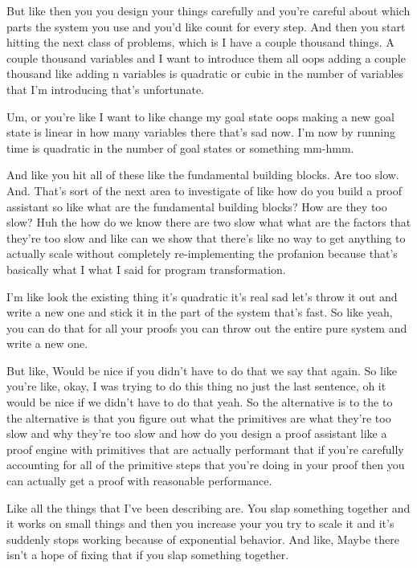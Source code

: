 But like then you you design your things carefully and you're careful about which parts the system you use and you'd like count for every step. And then you start hitting the next class of problems, which is I have a couple thousand things. A couple thousand variables and I want to introduce them all oops adding a couple thousand like adding n variables is quadratic or cubic in the number of variables that I'm introducing that's unfortunate. 

Um, or you're like I want to like change my goal state oops making a new goal state is linear in how many variables there that's sad now. I'm now by running time is quadratic in the number of goal states or something mm-hmm. 

And like you hit all of these like the fundamental building blocks. Are too slow. And. That's sort of the next area to investigate of like how do you build a proof assistant so like what are the fundamental building blocks? How are they too slow? Huh the how do we know there are two slow what what are the factors that they're too slow and like can we show that there's like no way to get anything to actually scale without completely re-implementing the profanion because that's basically what I what I said for program transformation. 

I'm like look the existing thing it's quadratic it's real sad let's throw it out and write a new one and stick it in the part of the system that's fast. So like yeah, you can do that for all your proofs you can throw out the entire pure system and write a new one. 

But like, Would be nice if you didn't have to do that we say that again. So like you're like, okay, I was trying to do this thing no just the last sentence, oh it would be nice if we didn't have to do that yeah. So the alternative is to the to the alternative is that you figure out what the primitives are what they're too slow and why they're too slow and how do you design a proof assistant like a proof engine with primitives that are actually performant that if you're carefully accounting for all of the primitive steps that you're doing in your proof then you can actually get a proof with reasonable performance. 

Like all the things that I've been describing are. You slap something together and it works on small things and then you increase your you try to scale it and it's suddenly stops working because of exponential behavior. And like, Maybe there isn't a hope of fixing that if you slap something together. 

